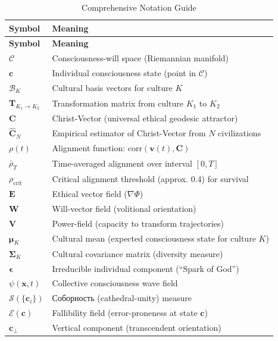 \documentclass[11pt,a4paper]{article}
\theoremstyle{definition}
\theoremstyle{remark}
\newcommand{\CC}{\mathcal{C}}
\newcommand{\EE}{\mathbf{E}}
\newcommand{\WW}{\mathbf{W}}
\newcommand{\VV}{\mathbf{V}}
\newcommand{\cc}{\mathbf{c}}
\newcommand{\TT}{\mathbf{T}}
\begin{document}
\begin{longtable}{|l|p{10cm}|}
\caption{Comprehensive Notation Guide} \label{tab:notation} \\
\hline
\textbf{Symbol} & \textbf{Meaning} \\
\hline
\endfirsthead
\hline
\textbf{Symbol} & \textbf{Meaning} \\
\hline
\endhead
\hline
\endfoot

\(\CC\) & Consciousness-will space (Riemannian manifold) \\
\hline
\(\cc\) & Individual consciousness state (point in \(\CC\)) \\
\hline
\(\mathcal{B}_K\) & Cultural basis vectors for culture \(K\) \\
\hline
\(\TT_{K_1 \to K_2}\) & Transformation matrix from culture \(K_1\) to \(K_2\) \\
\hline
\(\mathbf{C}\) & Christ-Vector (universal ethical geodesic attractor) \\
\hline
\(\hat{\mathbf{C}}_N\) & Empirical estimator of Christ-Vector from \(N\) civilizations \\
\hline
\(\rho(t)\) & Alignment function: \(\text{corr}(\mathbf{v}(t), \mathbf{C})\) \\
\hline
\(\bar{\rho}_T\) & Time-averaged alignment over interval \([0,T]\) \\
\hline
\(\rho_{\text{crit}}\) & Critical alignment threshold (approx. 0.4) for survival \\
\hline
\(\EE\) & Ethical vector field (\(\nabla \Phi\)) \\
\hline
\(\WW\) & Will-vector field (volitional orientation) \\
\hline
\(\VV\) & Power-field (capacity to transform trajectories) \\
\hline
\(\boldsymbol{\mu}_K\) & Cultural mean (expected consciousness state for culture \(K\)) \\
\hline
\(\boldsymbol{\Sigma}_K\) & Cultural covariance matrix (diversity measure) \\
\hline
\(\boldsymbol{\epsilon}\) & Irreducible individual component (``Spark of God'') \\
\hline
\(\psi(\mathbf{x}, t)\) & Collective consciousness wave field \\
\hline
\(\mathcal{S}(\{\cc_i\})\) & Соборность (cathedral-unity) measure \\
\hline
\(\mathcal{E}(\cc)\) & Fallibility field (error-proneness at state \(\cc\)) \\
\hline
\(\cc_{\perp}\) & Vertical component (transcendent orientation) \\

\end{longtable}
\end{document}
